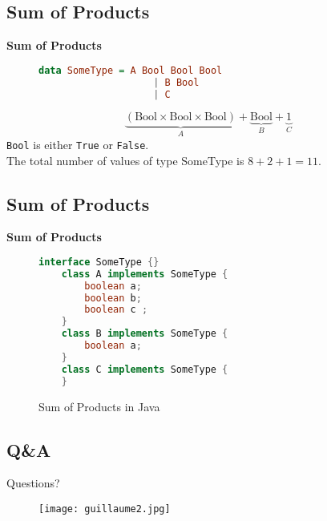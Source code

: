 \subsection{Sum of Products}
\begin{frame}[fragile]{\textbf{Sum of Products}}
    \begin{figure}
        \centering
        \begin{minipage}{.5\textwidth}
            \begin{lstlisting}[language=Haskell]
    data SomeType = A Bool Bool Bool
                    | B Bool
                    | C
            \end{lstlisting}
        \end{minipage} 
    \end{figure}
    
    \begin{examples}
        \begin{equation*}
            \underbrace{(\text{Bool} \times \text{Bool} \times \text{Bool})}_{A} + \underbrace{\text{Bool}}_{B} + \underbrace{1}_{C}
        \end{equation*}
        \texttt{Bool} is either \texttt{True} or \texttt{False}.\\
        The total number of values of type SomeType is $8 + 2 + 1 = 11$.
    \end{examples}
\end{frame}

\subsection*{Sum of Products}
\begin{frame}[fragile]{\textbf{Sum of Products}}
    \begin{figure}
        \centering
        \begin{minipage}{\textwidth}
            \centering
            \begin{lstlisting}[language=Java]
    interface SomeType {}
    class A implements SomeType {
        boolean a;
        boolean b;
        boolean c ;
    }
    class B implements SomeType {
        boolean a;
    }
    class C implements SomeType {
    }
            \end{lstlisting}
        \end{minipage}
        \caption{Sum of Products in Java}
    \end{figure}
\end{frame}

\subsection*{Q\&A}
\begin{frame}{Questions?}
    \begin{figure}
        \centering
        \texttt{[image: guillaume2.jpg]}
    \end{figure}
\end{frame}
